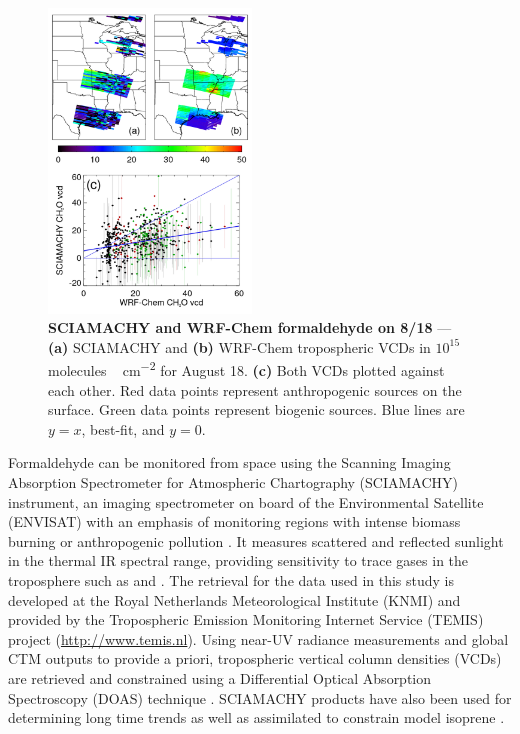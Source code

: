 	\begin{figure}
		\centering
		\vspace{-.3in}
		\begin{singlespacing}
		\includegraphics[width=0.48\textwidth]{scia_ch2o_compare_0818}
		\caption[SCIAMACHY and WRF-Chem formaldehyde on 8/18]{{\small\textbf{SCIAMACHY and WRF-Chem formaldehyde on 8/18} --- \textbf{(a)} SCIAMACHY and
		\textbf{(b)} WRF-Chem  tropospheric VCDs in $10^{15}\,$\unit{molecules\,cm^{-2}} for August 18. \textbf{(c)} Both VCDs plotted against each other.
		Red data points represent anthropogenic sources on the surface. Green data points represent biogenic sources. Blue lines are $y=x$, best-fit, and $y=0$.}}
		\label{fig:2006/scia_hcho_0818}
		\end{singlespacing}
		\vspace{-.2in}
	\end{figure}

Formaldehyde can be monitored from space using the Scanning Imaging Absorption Spectrometer for Atmospheric Chartography (SCIAMACHY) instrument, an imaging
spectrometer on board of the Environmental Satellite (ENVISAT) with an emphasis of monitoring regions with intense biomass burning or anthropogenic pollution
\citep{Burrows:1995fk,Bovensmann:1999uq}. It measures scattered and reflected sunlight in the thermal IR spectral range, providing sensitivity to trace gases in the
troposphere such as  and . The retrieval for the data used in this study is developed at the Royal Netherlands Meteorological Institute (KNMI)
and provided by the Tropospheric Emission Monitoring Internet Service (TEMIS) project (\url{http://www.temis.nl}). Using near-UV radiance measurements and global
CTM outputs to provide a priori,  tropospheric vertical column densities (VCDs) are retrieved and constrained using a Differential Optical Absorption
Spectroscopy (DOAS) technique \citep{De-Smedt:2008uq}. SCIAMACHY  products have also been used for determining long time trends \citep{De-Smedt:2010kx} as
well as assimilated to constrain model isoprene \citep{Dufour:2009fk}.

